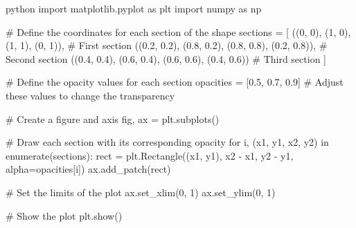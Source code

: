 python
import matplotlib.pyplot as plt
import numpy as np

# Define the coordinates for each section of the shape
sections = [
    ((0, 0), (1, 0), (1, 1), (0, 1)),  # First section
    ((0.2, 0.2), (0.8, 0.2), (0.8, 0.8), (0.2, 0.8)),  # Second section
    ((0.4, 0.4), (0.6, 0.4), (0.6, 0.6), (0.4, 0.6))   # Third section
]

# Define the opacity values for each section
opacities = [0.5, 0.7, 0.9]  # Adjust these values to change the transparency

# Create a figure and axis
fig, ax = plt.subplots()

# Draw each section with its corresponding opacity
for i, (x1, y1, x2, y2) in enumerate(sections):
    rect = plt.Rectangle((x1, y1), x2 - x1, y2 - y1, alpha=opacities[i])
    ax.add_patch(rect)

# Set the limits of the plot
ax.set_xlim(0, 1)
ax.set_ylim(0, 1)

# Show the plot
plt.show()